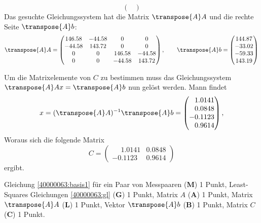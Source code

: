 \begin{loesung}
\begin{teilaufgaben}
\[\begin{pmatrix}
\end{pmatrix}
\]
Das gesuchte Gleichungssystem hat die Matrix $\transpose{A}A$ und die rechte
Seite $\transpose{A}b$:
\[
\transpose{A}A
=
\begin{pmatrix}
  146.58 & -44.58  &       0  &       0\\
  -44.58 & 143.72   &      0   &      0\\
         0   &      0  & 146.58 & -44.58\\
         0   &      0  & -44.58 & 143.72\\
\end{pmatrix}
,\qquad
\transpose{A}b=\begin{pmatrix}
    144.87\\
  -33.02\\
  -59.33\\
  143.19
  \end{pmatrix}
\]
\item
Um die Matrixelemente von $C$ zu bestimmen muss das Gleichungssystem
$\transpose{A}A x = \transpose{A}b $ nun gelöst werden. Mann findet
\[
  x = (\transpose{A}A)^{-1}\transpose{A}b = 
  \begin{pmatrix}
    \phantom{-}1.0141\\
    \phantom{-}0.0848\\
   -0.1123\\
    \phantom{-}0.9614\\ 
  \end{pmatrix},
\]
Woraus sich die folgende Matrix 
\[
  C =  \begin{pmatrix}
    \phantom{-}1.0141 & 0.0848\\
   -0.1123 & 0.9614 
  \end{pmatrix}
\]
ergibt.
\end{teilaufgaben}
\end{loesung}


\begin{bewertung}
Gleichung \eqref{40000063:basis1} für ein Paar von Messpaaren ({\bf M}) 1 Punkt,
Least-Squares Gleichungen \eqref{40000063:gl} ({\bf G}) 1 Punkt,
Matrix $A$ ({\bf A}) 1 Punkt,
Matrix $\transpose{A}A$ ({\bf L}) 1 Punkt,
Vektor $\transpose{A}b$ ({\bf B}) 1 Punkt,
Matrix $C$ ({\bf C}) 1 Punkt.
\end{bewertung}


